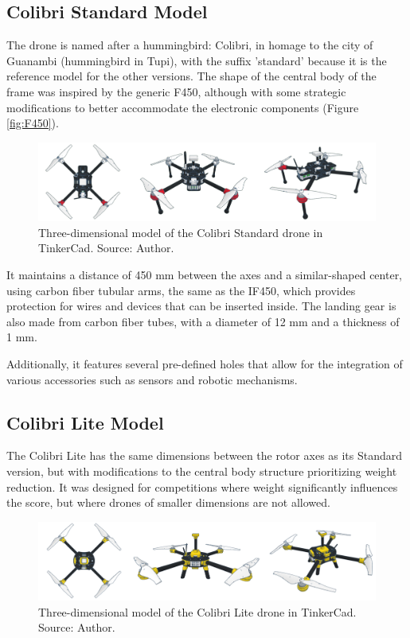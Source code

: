 \documentclass[conference]{IEEEtran}
\begin{document}
\subsection{Colibri Standard Model}

The drone is named after a hummingbird: Colibri, in homage to the city of Guanambi (hummingbird in Tupi), with the suffix 'standard' because it is the reference model for the other versions. The shape of the central body of the frame was inspired by the generic F450, although with some strategic modifications to better accommodate the electronic components (Figure \ref{fig:F450}).

\begin{figure}[!htb]
    \centering
    \includegraphics[scale=0.14]{img/Colibri-standard.png} 
    \caption{Three-dimensional model of the Colibri Standard drone in TinkerCad. Source: Author.}
    \label{fig:ColibriStandard}
\end{figure}

It maintains a distance of 450 mm between the axes and a similar-shaped center, using carbon fiber tubular arms, the same as the IF450, which provides protection for wires and devices that can be inserted inside. The landing gear is also made from carbon fiber tubes, with a diameter of 12 mm and a thickness of 1 mm.

Additionally, it features several pre-defined holes that allow for the integration of various accessories such as sensors and robotic mechanisms.

\subsection{Colibri Lite Model}

The Colibri Lite has the same dimensions between the rotor axes as its Standard version, but with modifications to the central body structure prioritizing weight reduction. It was designed for competitions where weight significantly influences the score, but where drones of smaller dimensions are not allowed.

\begin{figure}[!htb]
    \centering
    \includegraphics[scale=0.14]{img/Colibri-lite.png} 
    \caption{Three-dimensional model of the Colibri Lite drone in TinkerCad. Source: Author.}
    \label{fig:my_label}
\end{figure}
\end{document}
